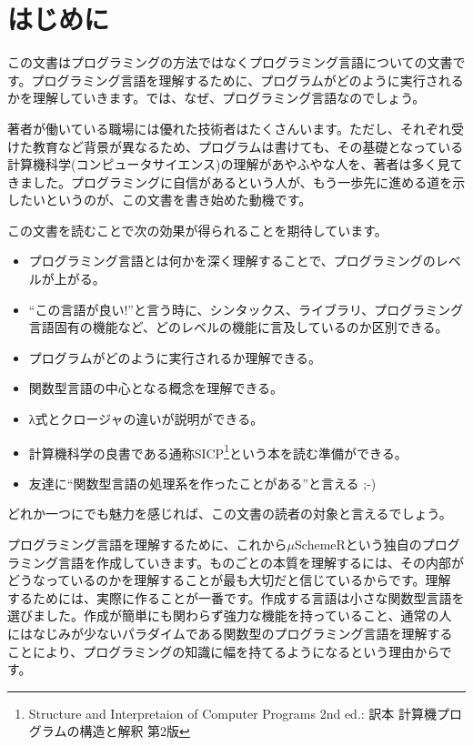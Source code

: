 

\chapter*{はじめに\hspace{-3mm}}

この文書はプログラミングの方法ではなくプログラミング言語についての文書です。プログラミング言語を理解するために、プログラムがどのように実行されるかを理解していきます。では、なぜ、プログラミング言語なのでしょう。

著者が働いている職場には優れた技術者はたくさんいます。ただし、それぞれ受けた教育など背景が異なるため、プログラムは書けても、その基礎となっている計算機科学(コンピュータサイエンス)の理解があやふやな人を、著者は多く見てきました。プログラミングに自信があるという人が、もう一歩先に進める道を示したいというのが、この文書を書き始めた動機です。

この文書を読むことで次の効果が得られることを期待しています。
\begin{itemize}
\item プログラミング言語とは何かを深く理解することで、プログラミングのレベルが上がる。
\item “この言語が良い!”と言う時に、シンタックス、ライブラリ、プログラミング言語固有の機能など、どのレベルの機能に言及しているのか区別できる。
\item プログラムがどのように実行されるか理解できる。
\item 関数型言語の中心となる概念を理解できる。
\item λ式とクロージャの違いが説明ができる。
\item 計算機科学の良書である通称SICP\footnote{Structure and Interpretaion of Computer Programs 2nd ed.: 訳本 計算機プログラムの構造と解釈 第2版}という本を読む準備ができる。
\item 友達に“関数型言語の処理系を作ったことがある”と言える ;-)
\end{itemize}
どれか一つにでも魅力を感じれば、この文書の読者の対象と言えるでしょう。

プログラミング言語を理解するために、これから$\mu$SchemeRという独自のプログ
ラミング言語を作成していきます。ものごとの本質を理解するには、その内部が
どうなっているのかを理解することが最も大切だと信じているからです。理解
するためには、実際に作ることが一番です。作成する言語は小さな関数型言語を
選びました。作成が簡単にも関わらず強力な機能を持っていること、通常の人
にはなじみが少ないパラダイムである関数型のプログラミング言語を理解する
ことにより、プログラミングの知識に幅を持てるようになるという理由からで
す。

